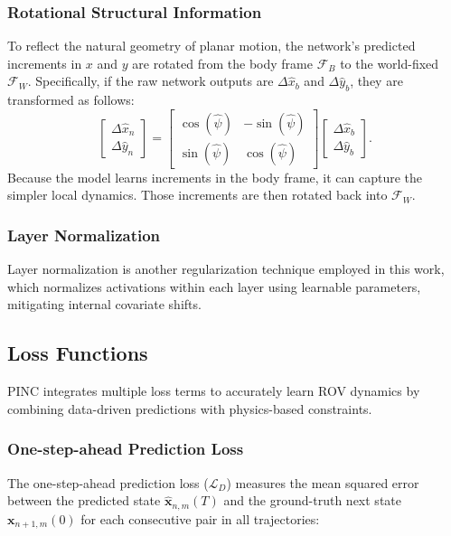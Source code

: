 \subsubsection{Rotational Structural Information}
To reflect the natural geometry of planar motion, the network’s predicted increments in $x$ and $y$ are rotated from the body frame $\mathcal{F}_B$ to the world-fixed $\mathcal{F}_W$. Specifically, if the raw network outputs are $\Delta \hat{x}_b$ and $\Delta \hat{y}_b$, they are transformed as follows:
\begin{equation}
    \begin{bmatrix}
        \Delta\hat{x}_n\\
        \Delta\hat{y}_n
    \end{bmatrix}=
    \begin{bmatrix}
        \cos(\hat{\psi}) & -\sin(\hat{\psi})\\
        \sin(\hat{\psi}) & \cos(\hat{\psi})
    \end{bmatrix}
    \begin{bmatrix}
        \Delta\hat{x}_b\\
        \Delta\hat{y}_b
    \end{bmatrix}.
\end{equation}
Because the model learns increments in the body frame, it can capture the simpler local dynamics. Those increments are then rotated back into $\mathcal{F}_W$.

\subsubsection{Layer Normalization} 
Layer normalization \cite{ba_layer_2016} is another regularization technique employed in this work, which normalizes activations within each layer using learnable parameters, mitigating internal covariate shifts. 

\subsection{Loss Functions}
\label{sec:loss_funcs}
PINC integrates multiple loss terms to accurately learn ROV dynamics by combining data-driven predictions with physics-based constraints. 

\subsubsection{One-step-ahead Prediction Loss}
The one-step-ahead prediction loss ($\mathcal{L}_D$) measures the mean squared error between the predicted state $\hat{\mathbf{x}}_{n,m}(T)$ and the ground-truth next state $\mathbf{x}_{n+1,m}(0)$ for each consecutive pair in all trajectories:

